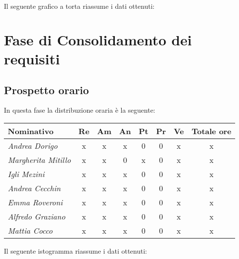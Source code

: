 {{Il seguente grafico a torta riassume i dati ottenuti:

\section{Fase di Consolidamento dei requisiti}\label{5.2}

\subsection{Prospetto orario}\label{5.2.1}
In questa fase la distribuzione oraria è la seguente:
\quad
\def\tabularxcolumn#1{m{#1}}
{
	
	\begin{center}
		\renewcommand{\arraystretch}{1.4}
		\begin{tabularx}{\textwidth}{|X|c|c|c|c|c|c|c|}
			\hline
			\rowcolor{airforceblue}
			\textbf{Nominativo} & \textbf{Re} & \textbf{Am} & \textbf{An} & \textbf{Pt} & \textbf{Pr} & \textbf{Ve} & \textbf{Totale ore}\\
			\hline
			\textit{Andrea Dorigo} & x & x & x & 0 & 0 & x & x\\
			\hline
			\textit{Margherita Mitillo} & x & x & 0 & x & 0 & x & x\\
			\hline
			\textit{Igli Mezini} & x & x & x & 0 & 0 & x & x\\
			\hline
			\textit{Andrea Cecchin} & x & x & x & 0 & 0 & x & x\\
			\hline
			\textit{Emma Roveroni} & x & x & x & 0 & 0 & x & x\\
			\hline
			\textit{Alfredo Graziano} & x & x & x & 0 & 0 & x & x\\
			\hline
			\textit{Mattia Cocco} & x & x & x & 0 & 0 & x & x\\
			\hline
		\end{tabularx}
	\end{center}

Il seguente istogramma riassume i dati ottenuti:

}}}
